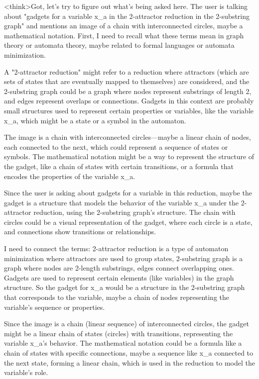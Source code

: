 <think>Got, let's try to figure out what's being asked here. The user is talking about "gadgets for a variable x_a in the 2-attractor reduction in the 2-substring graph" and mentions an image of a chain with interconnected circles, maybe a mathematical notation. First, I need to recall what these terms mean in graph theory or automata theory, maybe related to formal languages or automata minimization.

A "2-attractor reduction" might refer to a reduction where attractors (which are sets of states that are eventually mapped to themselves) are considered, and the 2-substring graph could be a graph where nodes represent substrings of length 2, and edges represent overlaps or connections. Gadgets in this context are probably small structures used to represent certain properties or variables, like the variable x_a, which might be a state or a symbol in the automaton.

The image is a chain with interconnected circles—maybe a linear chain of nodes, each connected to the next, which could represent a sequence of states or symbols. The mathematical notation might be a way to represent the structure of the gadget, like a chain of states with certain transitions, or a formula that encodes the properties of the variable x_a.

Since the user is asking about gadgets for a variable in this reduction, maybe the gadget is a structure that models the behavior of the variable x_a under the 2-attractor reduction, using the 2-substring graph's structure. The chain with circles could be a visual representation of the gadget, where each circle is a state, and connections show transitions or relationships.

I need to connect the terms: 2-attractor reduction is a type of automaton minimization where attractors are used to group states, 2-substring graph is a graph where nodes are 2-length substrings, edges connect overlapping ones. Gadgets are used to represent certain elements (like variables) in the graph structure. So the gadget for x_a would be a structure in the 2-substring graph that corresponds to the variable, maybe a chain of nodes representing the variable's sequence or properties.

Since the image is a chain (linear sequence) of interconnected circles, the gadget might be a linear chain of states (circles) with transitions, representing the variable x_a's behavior. The mathematical notation could be a formula like a chain of states with specific connections, maybe a sequence like x_a connected to the next state, forming a linear chain, which is used in the reduction to model the variable's role.

